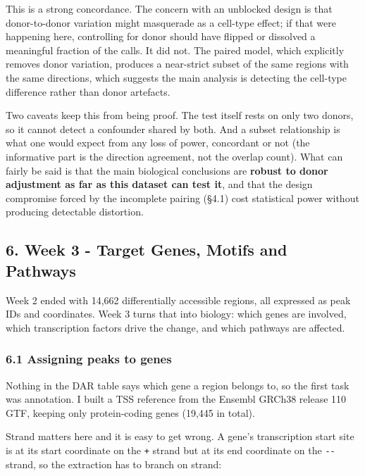 \documentclass[
  11pt,
  a4paper,
]{article}
\begin{document}
This is a strong concordance. The concern with an unblocked design is
that donor-to-donor variation might masquerade as a cell-type effect; if
that were happening here, controlling for donor should have flipped or
dissolved a meaningful fraction of the calls. It did not. The paired
model, which explicitly removes donor variation, produces a near-strict
subset of the same regions with the same directions, which suggests the
main analysis is detecting the cell-type difference rather than donor
artefacts.

Two caveats keep this from being proof. The test itself rests on only
two donors, so it cannot detect a confounder shared by both. And a
subset relationship is what one would expect from any loss of power,
concordant or not (the informative part is the direction agreement, not
the overlap count). What can fairly be said is that the main biological
conclusions are \textbf{robust to donor adjustment as far as this
dataset can test it}, and that the design compromise forced by the
incomplete pairing (§4.1) cost statistical power without producing
detectable distortion.

\hypertarget{week-3---target-genes-motifs-and-pathways}{%
\subsection{6. Week 3 - Target Genes, Motifs and
Pathways}\label{week-3---target-genes-motifs-and-pathways}}

Week 2 ended with 14,662 differentially accessible regions, all
expressed as peak IDs and coordinates. Week 3 turns that into biology:
which genes are involved, which transcription factors drive the change,
and which pathways are affected.

\hypertarget{assigning-peaks-to-genes}{%
\subsubsection{6.1 Assigning peaks to
genes}\label{assigning-peaks-to-genes}}

Nothing in the DAR table says which gene a region belongs to, so the
first task was annotation. I built a TSS reference from the Ensembl
GRCh38 release 110 GTF, keeping only protein-coding genes (19,445 in
total).

Strand matters here and it is easy to get wrong. A gene's transcription
start site is at its start coordinate on the \texttt{+} strand but at
its end coordinate on the \texttt{-\/-} strand, so the extraction has to
branch on strand:
\end{document}
